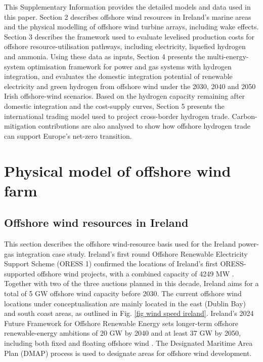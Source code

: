 \documentclass[sn-mathphys,Numbered]{sn-jnl}%
\theoremstyle{plain}%
\theoremstyle{definition}%
\theoremstyle{remark}%
\begin{document}
This Supplementary Information provides the detailed models and data used in this paper.
Section 2 describes offshore wind resources in Ireland's marine areas and the physical modelling of offshore wind turbine arrays, including wake effects.
Section 3 describes the framework used to evaluate levelised production costs for offshore resource-utilisation pathways, including electricity, liquefied hydrogen and ammonia.
Using these data as inputs, Section 4 presents the multi-energy-system optimisation framework for power and gas systems with hydrogen integration, and evaluates the domestic integration potential of renewable electricity and green hydrogen from offshore wind under the 2030, 2040 and 2050 Irish offshore-wind scenarios.
Based on the hydrogen capacity remaining after domestic integration and the cost-supply curves, Section 5 presents the international trading model used to project cross-border hydrogen trade. Carbon-mitigation contributions are also analysed to show how offshore hydrogen trade can support Europe's net-zero transition.

\section{Physical model of offshore wind farm}
\label{sec offshore wind farm model}
\subsection{Offshore wind resources in Ireland}

This section describes the offshore wind-resource basis used for the Ireland power-gas integration case study.
Ireland's first round Offshore Renewable Electricity Support Scheme (ORESS 1) confirmed the locations of Ireland's first ORESS-supported offshore wind projects, with a combined capacity of 4249 MW \cite{ORESS1, OREDP1}. Together with two of the three auctions planned in this decade, Ireland aims for a total of 5 GW offshore wind capacity before 2030. The current offshore wind locations under conceptualisation are mainly located in the east (Dublin Bay) and south coast areas, as outlined in Fig. \ref{fig wind speed ireland}.
Ireland's 2024 Future Framework for Offshore Renewable Energy sets longer-term offshore renewable-energy ambitions of 20 GW by 2040 and at least 37 GW by 2050, including both fixed and floating offshore wind \cite{FutureFrameworkforOffshoreRenewableEnergy}. The Designated Maritime Area Plan (DMAP) process is used to designate areas for offshore wind development.
\end{document}
